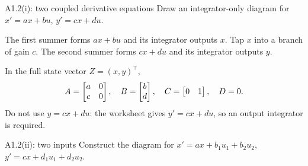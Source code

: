 \begin{question}{A1.2(i): two coupled derivative equations}
Draw an integrator-only diagram for $x'=ax+bu$, $y'=cx+du$.
\end{question}
\begin{answer}
The first summer forms $ax+bu$ and its integrator outputs $x$. Tap $x$ into a branch of gain $c$. The second summer forms $cx+du$ and its integrator outputs $y$.
\begin{center}
\end{center}
In the full state vector $Z=(x,y)^{\top}$,
\[A=\begin{bmatrix}a&0\\c&0\end{bmatrix},\quad B=\begin{bmatrix}b\\d\end{bmatrix},\quad C=\begin{bmatrix}0&1\end{bmatrix},\quad D=0.\]
Do not use $y=cx+du$: the worksheet gives $y'=cx+du$, so an output integrator is required.
\end{answer}
\begin{question}{A1.2(ii): two inputs}
Construct the diagram for $x'=ax+b_1u_1+b_2u_2$, $y'=cx+d_1u_1+d_2u_2$.
\end{question}
